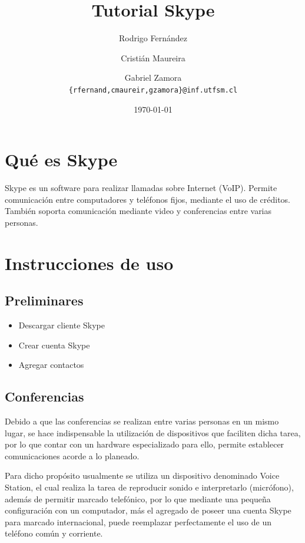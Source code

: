\documentclass[letter, 10pt]{article}
\begin{document}
\title{Tutorial Skype}
\author{Rodrigo Fernández \and Cristián Maureira \and Gabriel Zamora\\ \small{\texttt{\{rfernand,cmaureir,gzamora\}@inf.utfsm.cl}}}
\date{\today}

\maketitle

\section{Qué es Skype}

Skype es un software para realizar llamadas sobre Internet (VoIP). Permite comunicación entre computadores y teléfonos fijos, mediante el uso de créditos. También soporta comunicación mediante video y conferencias entre varias personas.

\section{Instrucciones de uso}

\subsection{Preliminares}

\begin{itemize}
	\item Descargar cliente Skype
	\item Crear cuenta Skype
	\item Agregar contactos
\end{itemize}

\subsection{Conferencias}

Debido a que las conferencias se realizan entre varias personas en un mismo lugar, se hace indispensable la utilización de dispositivos que faciliten dicha tarea, por lo que 
contar con un hardware especializado para ello, permite establecer comunicaciones acorde a lo planeado.

Para dicho propósito usualmente se utiliza un dispositivo denominado Voice Station, el cual realiza la tarea de reproducir sonido e interpretarlo (micrófono), además de permitir marcado telefónico, por lo que mediante una pequeña configuración con un computador, más el agregado de poseer una cuenta Skype para marcado internacional, puede reemplazar perfectamente el uso de un teléfono común y corriente.
\end{document}
